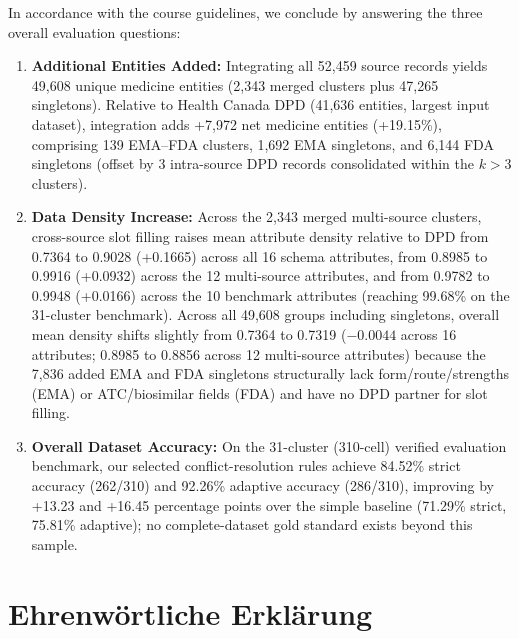 \documentclass{llncs}
\begin{document}
In accordance with the course guidelines, we conclude by answering the three overall evaluation questions:
\begin{enumerate}
  \item \textbf{Additional Entities Added:} Integrating all 52,459 source records yields 49,608 unique medicine entities (2,343 merged clusters plus 47,265 singletons). Relative to Health Canada DPD (41,636 entities, largest input dataset), integration adds +7,972 net medicine entities (+19.15\%), comprising 139 EMA--FDA clusters, 1,692 EMA singletons, and 6,144 FDA singletons (offset by 3 intra-source DPD records consolidated within the $k > 3$ clusters).
  \item \textbf{Data Density Increase:} Across the 2,343 merged multi-source clusters, cross-source slot filling raises mean attribute density relative to DPD from 0.7364 to 0.9028 (+0.1665) across all 16 schema attributes, from 0.8985 to 0.9916 (+0.0932) across the 12 multi-source attributes, and from 0.9782 to 0.9948 (+0.0166) across the 10 benchmark attributes (reaching 99.68\% on the 31-cluster benchmark). Across all 49,608 groups including singletons, overall mean density shifts slightly from 0.7364 to 0.7319 ($-0.0044$ across 16 attributes; 0.8985 to 0.8856 across 12 multi-source attributes) because the 7,836 added EMA and FDA singletons structurally lack form/route/strengths (EMA) or ATC/biosimilar fields (FDA) and have no DPD partner for slot filling.
  \item \textbf{Overall Dataset Accuracy:} On the 31-cluster (310-cell) verified evaluation benchmark, our selected conflict-resolution rules achieve 84.52\% strict accuracy (262/310) and 92.26\% adaptive accuracy (286/310), improving by +13.23 and +16.45 percentage points over the simple baseline (71.29\% strict, 75.81\% adaptive); no complete-dataset gold standard exists beyond this sample.
\end{enumerate}








\clearpage
\section*{Ehrenw\"ortliche Erkl\"arung}
\end{document}

